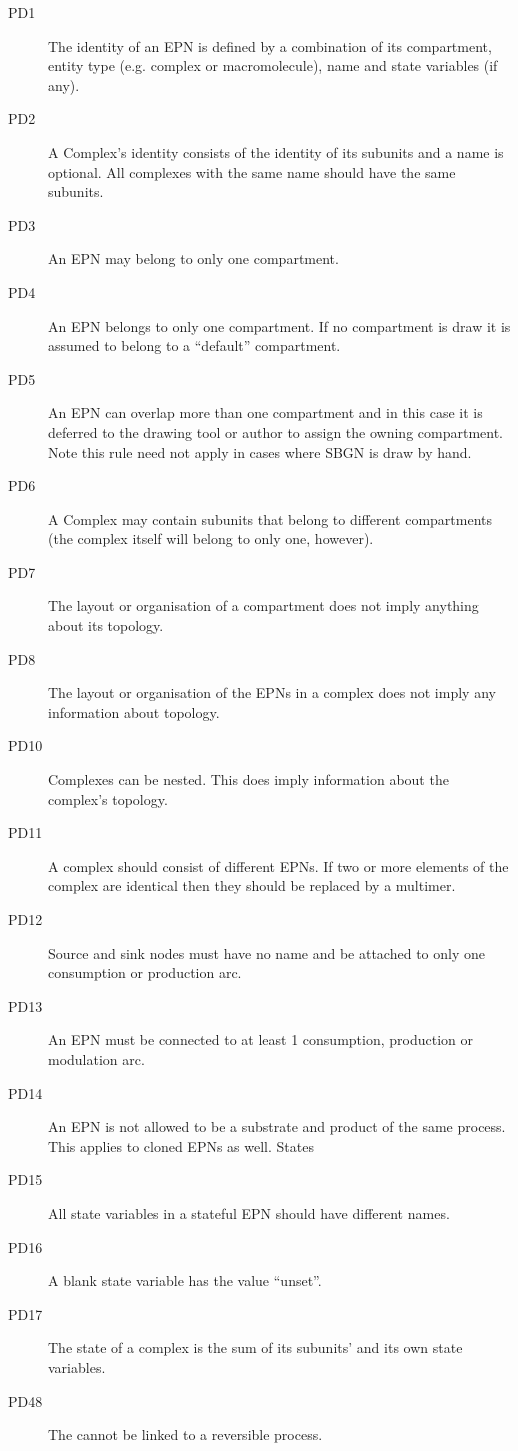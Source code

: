 \begin{description}
\item[PD1] The identity of an EPN is defined by a combination of its compartment, entity type (e.g. complex or macromolecule), name and state variables (if any).
\item[PD2] A Complex’s identity consists of the identity of its subunits and a name is optional. All complexes with the same name should have the same subunits.
\item[PD3] An EPN may belong to only one compartment.
\item[PD4] An EPN belongs to only one compartment. If no compartment is draw it is assumed to belong to a “default” compartment.
\item[PD5] An EPN can overlap more than one compartment and in this case it is deferred to the drawing tool or author to assign the owning compartment. Note this rule need not apply in cases where SBGN is draw by hand.
\item[PD6] A Complex may contain subunits that belong to different compartments (the complex itself will belong to only one, however).
\item[PD7] The layout or organisation of a compartment does not imply anything about its topology.
\item[PD8] The layout or organisation of the EPNs in a complex does not imply any information about topology.
\item[PD10] Complexes can be nested. This does imply information about the complex’s topology.
\item[PD11] A complex should consist of different EPNs. If two or more elements of the complex are identical then they should be replaced by a multimer.
\item[PD12] Source and sink nodes must have no name and be attached to only one consumption or production arc.
\item[PD13] An EPN must be connected to at least 1 consumption, production or modulation arc.
\item[PD14] An EPN is not allowed to be a substrate and product of the same process. This applies to cloned EPNs as well.
States
\item[PD15] All state variables in a stateful EPN should have different names.
\item[PD16] A blank state variable has the value “unset”.
\item[PD17] The state of a complex is the sum of its subunits’ and its own state variables.
\item[PD48] The  cannot be linked to a reversible process.
\end{description}

